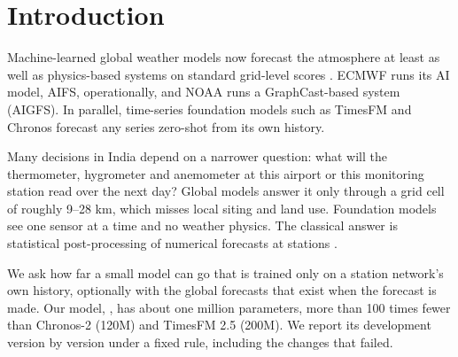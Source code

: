 \section{Introduction}

Machine-learned global weather models now forecast the atmosphere at least as well as physics-based systems on
standard grid-level scores \citep{lam2023graphcast,price2025gencast,lang2024aifs}. ECMWF runs its AI model, AIFS,
operationally, and NOAA runs a GraphCast-based system (AIGFS). In parallel, time-series foundation models such as
TimesFM \citep{das2024timesfm} and Chronos \citep{ansari2024chronos,ansari2025chronos2} forecast any series
zero-shot from its own history.

Many decisions in India depend on a narrower question: what will the thermometer, hygrometer and anemometer at
this airport or this monitoring station read over the next day? Global models answer it only through a grid cell
of roughly 9--28 km, which misses local siting and land use. Foundation models see one sensor at a time and no
weather physics. The classical answer is statistical post-processing of numerical forecasts at stations
\citep{glahn1972mos,gneiting2005emos,rasp2018postprocessing}.

We ask how far a small model can go that is trained only on a station network's own history, optionally with the
global forecasts that exist when the forecast is made. Our model, \pwm, has about one million parameters, more
than 100 times fewer than Chronos-2 (120M) and TimesFM 2.5 (200M). We report its development version by
version under a fixed rule, including the changes that failed.

